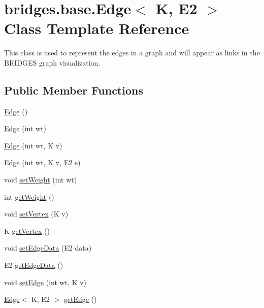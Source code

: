 \hypertarget{classbridges_1_1base_1_1_edge}{}\section{bridges.\+base.\+Edge$<$ K, E2 $>$ Class Template Reference}
\label{classbridges_1_1base_1_1_edge}


This class is used to represent the edges in a graph and will appear as links in the B\+R\+I\+D\+G\+E\+S graph visualization.  


\subsection*{Public Member Functions}
\begin{DoxyCompactItemize}
\item 
\hyperlink{classbridges_1_1base_1_1_edge_a7b1ff43c94076afdc1b9be4665eefb9b}{Edge} ()
\item 
\hyperlink{classbridges_1_1base_1_1_edge_a8e9a4fb99d91f481e29c3ab632063267}{Edge} (int wt)
\item 
\hyperlink{classbridges_1_1base_1_1_edge_a545dc52ba877607102d36345cd80c583}{Edge} (int wt, K v)
\item 
\hyperlink{classbridges_1_1base_1_1_edge_ae909816352bcc2260969c9cfcf802fae}{Edge} (int wt, K v, E2 e)
\item 
void \hyperlink{classbridges_1_1base_1_1_edge_ad60cdae7be19065d528432c0c55f7b8c}{set\+Weight} (int wt)
\item 
int \hyperlink{classbridges_1_1base_1_1_edge_a63ad33282f3ae3ce48fb3fc8781b9916}{get\+Weight} ()
\item 
void \hyperlink{classbridges_1_1base_1_1_edge_a02684f6a156a82d431d5d82cf4f943a2}{set\+Vertex} (K v)
\item 
K \hyperlink{classbridges_1_1base_1_1_edge_a77eee3cc9fc7c00bc08388cd0f748285}{get\+Vertex} ()
\item 
void \hyperlink{classbridges_1_1base_1_1_edge_a733d7f5eb4950d1fc4e14b7096faeb5c}{set\+Edge\+Data} (E2 data)
\item 
E2 \hyperlink{classbridges_1_1base_1_1_edge_a19a623d647eb17b7e53f1360577b0703}{get\+Edge\+Data} ()
\item 
void \hyperlink{classbridges_1_1base_1_1_edge_aaa68d6a438529aebd69d8b45dc90314e}{set\+Edge} (int wt, K v)
\item 
\hyperlink{classbridges_1_1base_1_1_edge}{Edge}$<$ K, E2 $>$ \hyperlink{classbridges_1_1base_1_1_edge_a6f94904384aa54ec5f38073ebfcd49e8}{get\+Edge} ()
\end{DoxyCompactItemize}


